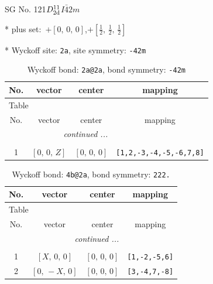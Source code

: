 \documentclass[fleqn,8pt]{jsarticle}
\begin{document}
\setcounter{MaxMatrixCols}{32}

\renewcommand{\tablename}{Table~}
\renewcommand{\figurename}{Figure~}
\begin{center}
\LARGE
SG No. 121\quad$D_{\rm 2d}^{11}$\quad$I\bar{4}2m$\quad[ tetragonal ]
\end{center}

* plus set:\,\,\,$+\left[ 0,\, 0,\, 0 \right]$,\quad $+\left[ \frac{1}{2},\, \frac{1}{2},\, \frac{1}{2} \right]$


* Wyckoff site: {\tt 2a}, site symmetry: {\tt -42m}
\renewcommand{\arraystretch}{1.2}
\begin{longtable}{cccc}
\caption{Wyckoff bond: {\tt 2a@2a}, bond symmetry: {\tt -42m}}
 \\
 \hline \hline
No. & vector & center & mapping \\ \hline \endfirsthead

\multicolumn{3}{l}{\tablename\ \thetable{}} \\
 \hline \hline
No. & vector & center & mapping \\ \hline \endhead

 \hline \hline
\multicolumn{3}{r}{\footnotesize\it continued ...} \\ \endfoot

 \hline \hline
\multicolumn{3}{r}{} \\ \endlastfoot

1 & $\left[ 0,\, 0,\, Z \right]$ & $\left[ 0,\, 0,\, 0 \right]$ & {\tt [1,2,-3,-4,-5,-6,7,8]} \\
\end{longtable}
\renewcommand{\arraystretch}{1.2}
\begin{longtable}{cccc}
\caption{Wyckoff bond: {\tt 4b@2a}, bond symmetry: {\tt 222.}}
 \\
 \hline \hline
No. & vector & center & mapping \\ \hline \endfirsthead

\multicolumn{3}{l}{\tablename\ \thetable{}} \\
 \hline \hline
No. & vector & center & mapping \\ \hline \endhead

 \hline \hline
\multicolumn{3}{r}{\footnotesize\it continued ...} \\ \endfoot

 \hline \hline
\multicolumn{3}{r}{} \\ \endlastfoot

1 & $\left[ X,\, 0,\, 0 \right]$ & $\left[ 0,\, 0,\, 0 \right]$ & {\tt [1,-2,-5,6]} \\ \hline
2 & $\left[ 0,\, - X,\, 0 \right]$ & $\left[ 0,\, 0,\, 0 \right]$ & {\tt [3,-4,7,-8]} \\
\end{longtable}
\end{document}
